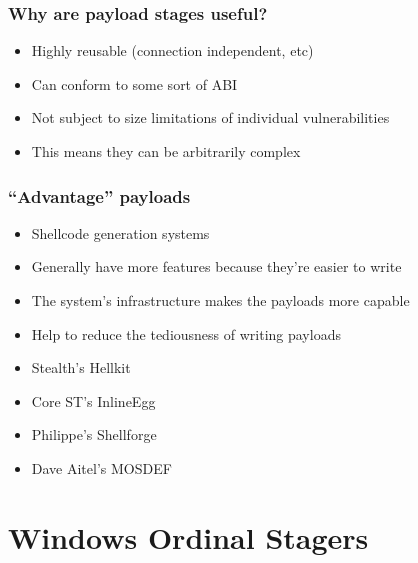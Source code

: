 \documentclass{beamer}
\newenvironment{sitemize}{\vspace{1mm}\begin{itemize}\itemsep 4pt\small}{\end{itemize}}
\begin{document}
\begin{frame}[t]
    \frametitle{Why are payload stages useful?}

    \begin{sitemize}
        \item Highly reusable (connection independent, etc)
    \item Can conform to some sort of ABI

        \pause
        \item Not subject to size limitations of individual
        vulnerabilities
    \item This means they can be arbitrarily complex
    \end{sitemize}
\end{frame}

\begin{frame}[t]
    \frametitle{``Advantage'' payloads}

    \begin{sitemize}
    \item Shellcode generation systems
        \item Generally have more features because they're easier to write
    \item The system's infrastructure makes the payloads more capable
        \item Help to reduce the tediousness of writing payloads

    \pause

    \item Stealth's Hellkit
        \item Core ST's InlineEgg
    \item Philippe's Shellforge
    \item Dave Aitel's MOSDEF

    \end{sitemize}
\end{frame}

\section{Windows Ordinal Stagers}
\end{document}

